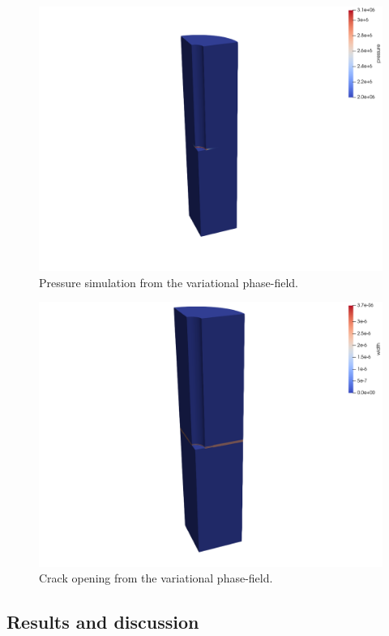 \begin{figure}
\centering
\includegraphics[width=1\linewidth]{figures/Keita_ME9_pres.png}
\caption{Pressure simulation from the variational phase-field.}
\label{fig:ME9_pressrue_VPF}
\end{figure}
\begin{figure}
\centering
\includegraphics[width=1\linewidth]{figures/Keita_ME9_width.png}
\caption{Crack opening from the variational phase-field.}
\label{fig:ME9_width_VPF}
\end{figure}


\subsection{Results and discussion}

